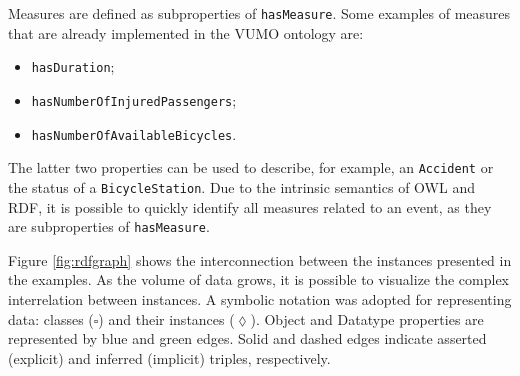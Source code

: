 \documentclass[]{interact}
\theoremstyle{plain}%
\theoremstyle{definition}
\theoremstyle{remark}
\theoremstyle{definition}
\begin{document}
%
%
%
%
%
%
%
%

Measures are defined as subproperties of \texttt{hasMeasure}. Some examples of measures that are already implemented in the VUMO ontology are:

\begin{itemize}
 \item \texttt{hasDuration};
 \item \texttt{hasNumberOfInjuredPassengers};
 \item \texttt{hasNumberOfAvailableBicycles}.
 \end{itemize}

 The latter two properties can be used to describe, for example, an \texttt{Accident} or the status of a \texttt{BicycleStation}. Due to the intrinsic semantics of OWL and RDF, it is possible to quickly identify all measures related to an event, as they are subproperties of \texttt{hasMeasure}.

Figure \ref{fig:rdfgraph} shows the interconnection between the instances presented in the examples. As the volume of data grows, it is possible to visualize the complex interrelation between instances. A symbolic notation was adopted for representing data: classes ($\square$) and their instances ($\lozenge$). Object and Datatype properties are represented by blue and green edges. Solid and dashed edges indicate asserted (explicit) and inferred (implicit) triples, respectively.
\end{document}
